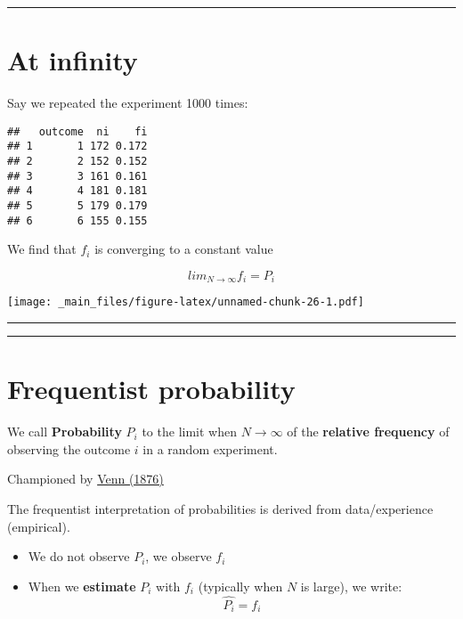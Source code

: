 \documentclass[
]{book}
\providecommand{\tightlist}{%
  \setlength{\itemsep}{0pt}\setlength{\parskip}{0pt}}
\begin{document}
\begin{center}\rule{0.5\linewidth}{0.5pt}\end{center}

\hypertarget{at-infinity}{%
\section{At infinity}\label{at-infinity}}

Say we repeated the experiment 1000 times:

\begin{verbatim}
##   outcome  ni    fi
## 1       1 172 0.172
## 2       2 152 0.152
## 3       3 161 0.161
## 4       4 181 0.181
## 5       5 179 0.179
## 6       6 155 0.155
\end{verbatim}

We find that \(f_i\) is converging to a constant value

\[lim_{N\rightarrow \infty} f_i = P_i\]

\texttt{[image: \_main\_files/figure-latex/unnamed-chunk-26-1.pdf]}

\begin{center}\rule{0.5\linewidth}{0.5pt}\end{center}

\begin{center}\rule{0.5\linewidth}{0.5pt}\end{center}

\hypertarget{frequentist-probability}{%
\section{Frequentist probability}\label{frequentist-probability}}

We call \textbf{Probability} \(P_i\) to the limit when \(N \rightarrow \infty\) of the \textbf{relative frequency} of observing the outcome \(i\) in a random experiment.

Championed by \href{https://plato.stanford.edu/entries/probability-interpret/\#ClaPro}{Venn (1876)}

The frequentist interpretation of probabilities is derived from data/experience (empirical).

\begin{itemize}
\tightlist
\item
  We do not observe \(P_i\), we observe \(f_i\)
\item
  When we \textbf{estimate} \(P_i\) with \(f_i\) (typically when \(N\) is large), we write: \[\hat{P_i}=f_i\]
\end{itemize}
\end{document}
